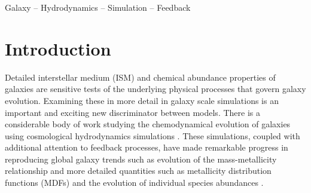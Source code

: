\documentclass[fleqn,usenatbib,useAMS]{mnras}
\begin{document}
\begin{keywords}
Galaxy -- Hydrodynamics -- Simulation -- Feedback
\end{keywords}

\section{Introduction}
%
%
%

Detailed interstellar medium (ISM) and chemical abundance properties of galaxies are sensitive tests of the underlying physical processes that govern galaxy evolution. Examining these in more detail in galaxy scale simulations is an important and exciting new discriminator between models. There is a considerable body of work studying the chemodynamical evolution of galaxies using cosmological hydrodynamics simulations \citep[e.g.][]{OppenheimerDave2008,Wiersma2009,Shen2010,Simpson2013,Snaith2015,OWLS,EAGLE,FIRE}.
These simulations, coupled with additional attention to feedback processes, have made remarkable progress in reproducing global galaxy trends such as evolution of the mass-metallicity relationship \citep[e.g.][]{Obreja2014, Ma2016, Dave2017, Torrey2017} and more detailed quantities such as metallicity distribution functions (MDFs) and the evolution of individual species abundances \citep{Marcolini2008,Revaz2009,Sawala2010,RevazJablonka2012,Jeon2017,Hirai2017} . 
\end{document}

